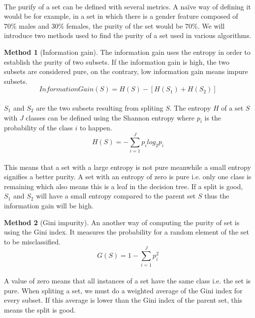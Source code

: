 \documentclass[12pt]{report}
\theoremstyle{definition}
\theoremstyle{definition}
\theoremstyle{definition}
\newtheorem*{method}{Method}
\begin{document}
\paragraph{} The purify of a set can be defined with several metrics. A naïve way of defining it would be for
example, in a set in which there is a gender feature composed of 70\% males and 30\% females, the purity of
the set would be 70\%. We will introduce two methods used to find the purity of a set used in various algorithms.

\begin{method}[Information gain]
    The information gain uses the entropy in order to establish the purity of two subsets. If the information
    gain is high, the two subsets are considered pure, on the contrary, low information gain means impure
    subsets.
    \begin{displaymath}
        InformationGain(S) = H(S) - [H(S_1) + H(S_2)]
    \end{displaymath}
    \paragraph{} $S_1$ and $S_2$ are the two subsets resulting from spliting $S$. The entropy $H$ of a set $S$
    with $J$ classes can be defined using the Shannon entropy where $p_i$ is the probability of the class $i$
    to happen.
    \begin{displaymath}
        H(S) = - \sum_{i=1}^{J} p_i log_2 p_i
    \end{displaymath}
    \paragraph{} This means that a set with a large entropy is not pure meanwhile a small entropy signifies a
    better purity. A set with an entropy of zero is pure i.e. only one class is remaining which also means this
    is a leaf in the decision tree. If a split is good, $S_1$ and $S_2$ will have a small entropy compared to the
    parent set $S$ thus the information gain will be high.
\end{method}

\begin{method}[Gini impurity]
    An another way of computing the purity of set is using the Gini index. It measures the probability for a
    random element of the set to be misclassified.
    \begin{displaymath}
        G(S) = 1 - \sum_{i=1}^{J} p_i^2
    \end{displaymath}
    \paragraph{} A value of zero means that all instances of a set have the same class i.e. the set is pure.
    When spliting a set, we must do a weighted average of the Gini index for every subset. If this average is lower
    than the Gini index of the parent set, this means the split is good.
\end{method}
\end{document}
